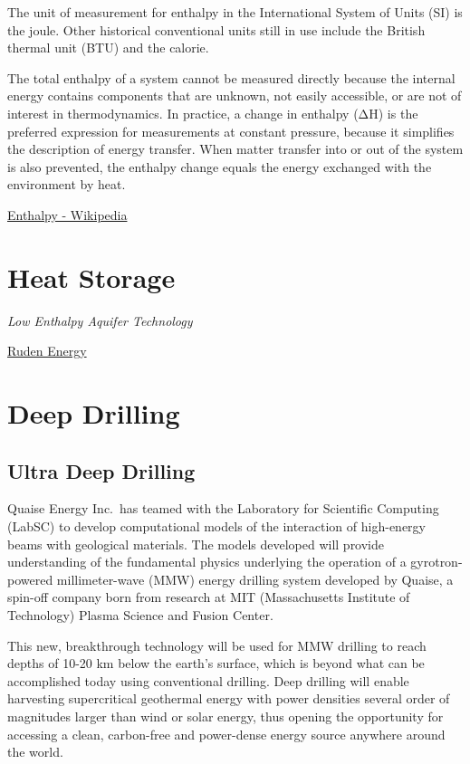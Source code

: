 \documentclass[
]{book}
\begin{document}
The unit of measurement for enthalpy in the International System of Units (SI) is the joule.
Other historical conventional units still in use include the British thermal unit (BTU) and the calorie.

The total enthalpy of a system cannot be measured directly because the internal energy contains components that are unknown, not easily accessible, or are not of interest in thermodynamics. In practice, a change in enthalpy (ΔH) is the preferred expression for measurements at constant pressure, because it simplifies the description of energy transfer. When matter transfer into or out of the system is also prevented, the enthalpy change equals the energy exchanged with the environment by heat.

\href{https://en.wikipedia.org/wiki/Enthalpy}{Enthalpy - Wikipedia}

\hypertarget{heat-storage}{%
\section{Heat Storage}\label{heat-storage}}

\emph{Low Enthalpy Aquifer Technology}

\href{https://rudenas.com/}{Ruden Energy}

\hypertarget{deep-drilling}{%
\section{Deep Drilling}\label{deep-drilling}}

\hypertarget{ultra-deep-drilling}{%
\subsection{Ultra Deep Drilling}\label{ultra-deep-drilling}}

Quaise Energy Inc.~has teamed with the Laboratory for Scientific Computing (LabSC) to develop computational models of the interaction of high-energy beams with geological materials.
The models developed will provide understanding of the fundamental physics underlying the operation of a gyrotron-powered millimeter-wave (MMW) energy drilling system developed by Quaise, a spin-off company born from research at MIT (Massachusetts Institute of Technology) Plasma Science and Fusion Center.

This new, breakthrough technology will be used for MMW drilling to reach depths of 10-20 km below the earth's surface, which is beyond what can be accomplished today using conventional drilling.
Deep drilling will enable harvesting supercritical geothermal energy with power densities several order of magnitudes larger than wind or solar energy, thus opening the opportunity for accessing a clean, carbon-free and power-dense energy source anywhere around the world.
\end{document}
